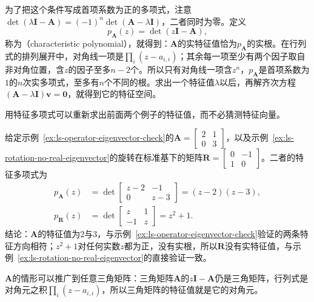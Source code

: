 为了把这个条件写成首项系数为正的多项式，注意$\det(\lambda\bm I-\bm A)=(-1)^n\det(\bm A-\lambda\bm I)$，二者同时为零。定义
\begin{equation}
 p_{\bm A}(z)=\det(z\bm I-\bm A),
 \label{eq:matrix-analysis-characteristic-polynomial}
\end{equation}
称为（characteristic polynomial），就得到：$\bm A$的实特征值恰为$p_{\bm A}$的实根。在行列式的排列展开中，对角线一项是$\prod_i(z-a_{i,i})$；其余每一项至少有两个因子取自非对角位置，含$z$的因子至多$n-2$个。所以只有对角线一项含$z^n$，$p_{\bm A}$是首项系数为$1$的$n$次实多项式，至多有$n$个不同的根。求出一个特征值$\lambda$以后，再解齐次方程$(\bm A-\lambda\bm I)\bm v=\bm0$，就得到它的特征空间。

用特征多项式可以重新求出前面两个例子的特征值，而不必猜测特征向量。
\begin{example}[用特征多项式求特征值]
\label{ex:ls-characteristic-polynomial-two-by-two}
给定示例~\ref{ex:ls-operator-eigenvector-check}的$\bm A=\left[\begin{smallmatrix}2&1\\0&3\end{smallmatrix}\right]$，以及示例~\ref{ex:ls-rotation-no-real-eigenvector}的旋转在标准基下的矩阵$\bm R=\left[\begin{smallmatrix}0&-1\\1&0\end{smallmatrix}\right]$。二者的特征多项式为
\[
 \begin{aligned}
 p_{\bm A}(z)&=\det\begin{bmatrix}z-2&-1\\0&z-3\end{bmatrix}=(z-2)(z-3),\\
 p_{\bm R}(z)&=\det\begin{bmatrix}z&1\\-1&z\end{bmatrix}=z^2+1 .
 \end{aligned}
\]
结论：$\bm A$的特征值为$2$与$3$，与示例~\ref{ex:ls-operator-eigenvector-check}验证的两条特征方向相符；$z^2+1$对任何实数$z$都为正，没有实根，所以$\bm R$没有实特征值，与示例~\ref{ex:ls-rotation-no-real-eigenvector}的直接验证一致。
\end{example}
$\bm A$的情形可以推广到任意三角矩阵：三角矩阵$\bm A$的$z\bm I-\bm A$仍是三角矩阵，行列式是对角元之积$\prod_i(z-a_{i,i})$，所以三角矩阵的特征值就是它的对角元。

